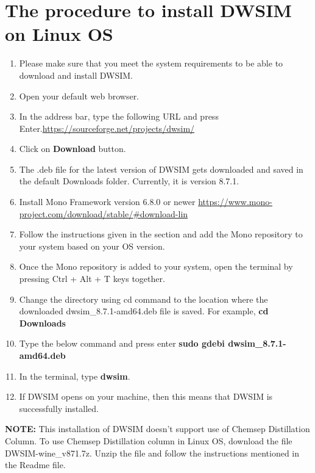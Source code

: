 \documentclass[a4paper,12pt]{article}
\begin{document}
\section{The procedure to install DWSIM on Linux OS}

\begin{enumerate}
\item Please make sure that you meet the system requirements to be able to download and install DWSIM.
\item Open your default web browser.
\item In the address bar, type the following URL and press Enter.\newline \url{https://sourceforge.net/projects/dwsim/}
\item Click on \textbf{Download} button.
\item The .deb file for the latest version of DWSIM gets downloaded and saved in the default Downloads folder. Currently, it is version 8.7.1.
\item Install Mono Framework version 6.8.0 or newer
\newline \url{https://www.mono-project.com/download/stable/#download-lin}
\item Follow the instructions given in the section and add the Mono repository to your system based on your OS version. 
\item Once the Mono repository is added to your system, open the terminal by pressing Ctrl + Alt + T keys together.
\item Change the directory using cd command to the location where the downloaded dwsim\_8.7.1-amd64.deb file is saved. For example, \textbf{cd Downloads}
\item Type the below command and press enter
\newline \textbf{sudo gdebi dwsim\_8.7.1-amd64.deb}
\item In the terminal, type \textbf{dwsim}.
\item If DWSIM opens on your machine, then this means that DWSIM is successfully installed.

\end{enumerate}

\noindent \textbf{NOTE:} This installation of DWSIM doesn't support use of Chemsep Distillation Column. To use Chemsep Distillation column in Linux OS, download the file DWSIM-wine\_v871.7z. Unzip the file and follow the instructions mentioned in the Readme file.
\end{document}
